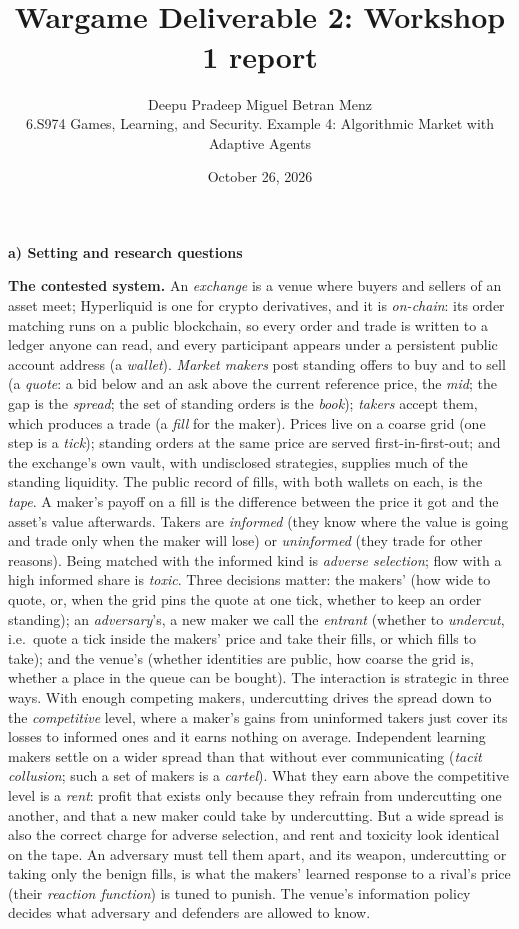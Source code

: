 \documentclass[10pt]{article}
\title{\vspace{-1.6em}{\Large\textbf{Rent or Toxicity? Strategic Exploitability of Learning Market Makers\\ with Public Wallet Information}}\\[0.15em]\large Wargame Deliverable 2: Workshop 1 report}
\author{Deepu Pradeep \quad Miguel Betran Menz\\
\normalsize 6.S974 Games, Learning, and Security. Example 4: Algorithmic Market with Adaptive Agents}
\date{October 26, 2026}
\newcommand{\sect}[1]{\par\vspace{5pt}\noindent\textbf{#1}\par\vspace{1.5pt}\noindent}
\begin{document}
\maketitle
\vspace{-2.2em}

\sect{a) Setting and research questions}
\textbf{The contested system.} An \emph{exchange} is a venue where buyers and sellers of an asset meet; Hyperliquid is one for crypto derivatives, and it is \emph{on-chain}: its order matching runs on a public blockchain, so every order and trade is written to a ledger anyone can read, and every participant appears under a persistent public account address (a \emph{wallet}). \emph{Market makers} post standing offers to buy and to sell (a \emph{quote}: a bid below and an ask above the current reference price, the \emph{mid}; the gap is the \emph{spread}; the set of standing orders is the \emph{book}); \emph{takers} accept them, which produces a trade (a \emph{fill} for the maker). Prices live on a coarse grid (one step is a \emph{tick}); standing orders at the same price are served first-in-first-out; and the exchange's own vault, with undisclosed strategies, supplies much of the standing liquidity. The public record of fills, with both wallets on each, is the \emph{tape}. A maker's payoff on a fill is the difference between the price it got and the asset's value afterwards. Takers are \emph{informed} (they know where the value is going and trade only when the maker will lose) or \emph{uninformed} (they trade for other reasons). Being matched with the informed kind is \emph{adverse selection}; flow with a high informed share is \emph{toxic}. Three decisions matter: the makers' (how wide to quote, or, when the grid pins the quote at one tick, whether to keep an order standing); an \emph{adversary}'s, a new maker we call the \emph{entrant} (whether to \emph{undercut}, i.e.\ quote a tick inside the makers' price and take their fills, or which fills to take); and the venue's (whether identities are public, how coarse the grid is, whether a place in the queue can be bought). The interaction is strategic in three ways. With enough competing makers, undercutting drives the spread down to the \emph{competitive} level, where a maker's gains from uninformed takers just cover its losses to informed ones and it earns nothing on average. Independent learning makers settle on a wider spread than that without ever communicating (\emph{tacit collusion}; such a set of makers is a \emph{cartel}). What they earn above the competitive level is a \emph{rent}: profit that exists only because they refrain from undercutting one another, and that a new maker could take by undercutting. But a wide spread is also the correct charge for adverse selection, and rent and toxicity look identical on the tape. An adversary must tell them apart, and its weapon, undercutting or taking only the benign fills, is what the makers' learned response to a rival's price (their \emph{reaction function}) is tuned to punish. The venue's information policy decides what adversary and defenders are allowed to know.
\end{document}
